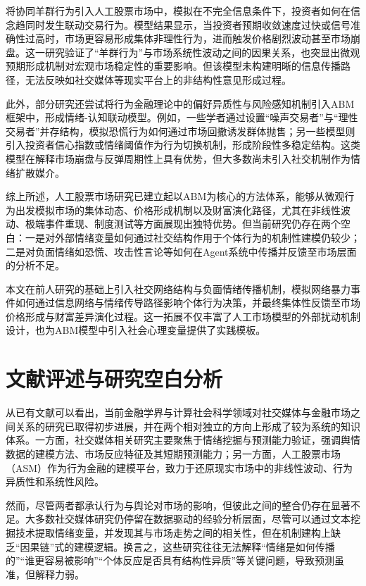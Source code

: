 \textcite{chen2021herding} 将协同羊群行为引入人工股票市场中，模拟在不完全信息条件下，投资者如何在信念趋同时发生联动交易行为。模型结果显示，当投资者预期收敛速度过快或信号准确性过高时，市场更容易形成集体非理性行为，进而触发价格剧烈波动甚至市场崩盘。这一研究验证了“羊群行为”与市场系统性波动之间的因果关系，也突显出微观预期形成机制对宏观市场稳定性的重要影响。但该模型未构建明晰的信息传播路径，无法反映如社交媒体等现实平台上的非结构性意见形成过程。

此外，部分研究还尝试将行为金融理论中的偏好异质性与风险感知机制引入ABM框架中，形成情绪-认知联动模型。例如，一些学者通过设置“噪声交易者”与“理性交易者”并存结构，模拟恐慌行为如何通过市场回撤诱发群体抛售；另一些模型则引入投资者信心指数或情绪阈值作为行为切换机制，形成阶段性多稳定结构。这类模型在解释市场崩盘与反弹周期性上具有优势，但大多数尚未引入社交机制作为情绪扩散媒介。

综上所述，人工股票市场研究已建立起以ABM为核心的方法体系，能够从微观行为出发模拟市场的集体动态、价格形成机制以及财富演化路径，尤其在非线性波动、极端事件重现、制度测试等方面展现出独特优势。但当前研究仍存在两个空白：一是对外部情绪变量如何通过社交结构作用于个体行为的机制性建模仍较少；二是对负面情绪如恐慌、攻击性言论等如何在Agent系统中传播并反馈至市场层面的分析不足。

本文在前人研究的基础上引入社交网络结构与负面情绪传播机制，模拟网络暴力事件如何通过信息网络与情绪传导路径影响个体行为决策，并最终集体性反馈至市场价格形成与财富差异演化过程。这一拓展不仅丰富了人工市场模型的外部扰动机制设计，也为ABM模型中引入社会心理变量提供了实践模板。


\section{文献评述与研究空白分析}

从已有文献可以看出，当前金融学界与计算社会科学领域对社交媒体与金融市场之间关系的研究已取得初步进展，并在两个相对独立的方向上形成了较为系统的知识体系。一方面，社交媒体相关研究主要聚焦于情绪挖掘与预测能力验证，强调舆情数据的建模方法、市场反应特征及其短期预测能力；另一方面，人工股票市场（ASM）作为行为金融的建模平台，致力于还原现实市场中的非线性波动、行为异质性和系统性风险。

然而，尽管两者都承认行为与舆论对市场的影响，但彼此之间的整合仍存在显著不足。大多数社交媒体研究仍停留在数据驱动的经验分析层面，尽管可以通过文本挖掘技术提取情绪变量，并发现其与市场走势之间的相关性，但在机制建构上缺乏“因果链”式的建模逻辑。换言之，这些研究往往无法解释“情绪是如何传播的”“谁更容易被影响”“个体反应是否具有结构性异质”等关键问题，导致预测虽准，但解释力弱。

